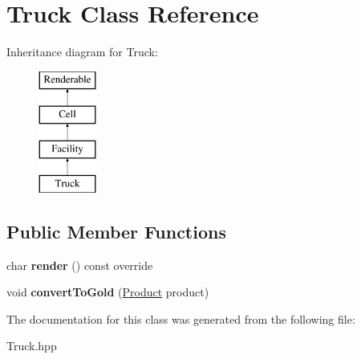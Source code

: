 \hypertarget{class_truck}{}\section{Truck Class Reference}
\label{class_truck}
Inheritance diagram for Truck\+:\begin{figure}[H]
\begin{center}
\leavevmode
\includegraphics[height=4.000000cm]{class_truck}
\end{center}
\end{figure}
\subsection*{Public Member Functions}
\begin{DoxyCompactItemize}
\item 
\mbox{\label{class_truck_afd75ba37af1154ccf9cb12d44eb57c78}} 
char {\bfseries render} () const override
\item 
\mbox{\label{class_truck_a0d7b872068034adec40acbd79f932762}} 
void {\bfseries convert\+To\+Gold} (\mbox{\hyperlink{class_product}{Product}} product)
\end{DoxyCompactItemize}


The documentation for this class was generated from the following file\+:\begin{DoxyCompactItemize}
\item 
Truck.\+hpp\end{DoxyCompactItemize}
